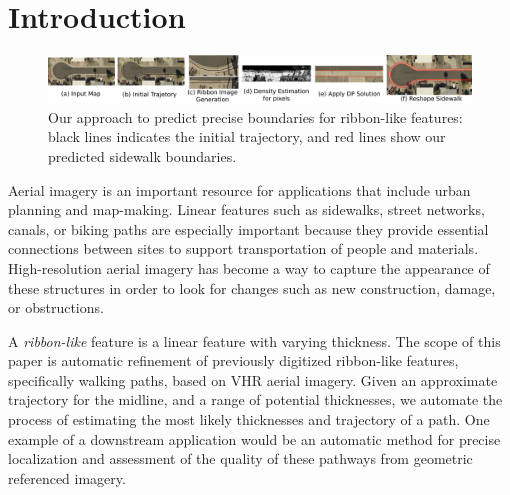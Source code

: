 \section{Introduction}

\begin{figure}[tb!]
\begin{center}
\includegraphics[width=\textwidth]{Figures/diagram.pdf}
\caption[Framework Overview]{Our approach to predict precise boundaries for ribbon-like features: black lines indicates the initial trajectory, and red lines show our predicted sidewalk boundaries.}
\label{fig:Apparatus}
\end{center}
\end{figure}


Aerial imagery is an important resource for applications that include urban planning and map-making. 
Linear features such as sidewalks, street networks, canals, or biking paths are especially important because they provide essential connections between sites to support transportation of people and materials.
High-resolution aerial imagery has become a way to capture the appearance of these structures in order to look for changes such as new construction, damage, or obstructions. 

A \textit{ribbon-like} feature is a linear feature with varying thickness.
The scope of this paper is automatic refinement of previously digitized ribbon-like features, specifically walking paths, based on \ac{VHR} aerial imagery.
Given an approximate trajectory for the midline, and a range of potential thicknesses, we automate the process of estimating the most likely thicknesses and  trajectory of a path. 
One example of a downstream application would be an automatic method for precise localization and assessment of the quality of these pathways from geometric referenced imagery. 

